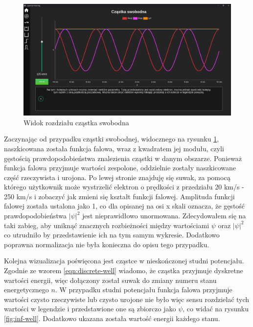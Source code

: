 \documentclass{SGGW-thesis}
\begin{document}
	\begin{figure}[H]
	\includegraphics[width=\textwidth,height=\textheight,keepaspectratio]{free.png} 
	\caption{Widok rozdziału cząstka swobodna}
	\label{fig:free-chart}
	\end{figure}	
	
	Zaczynając od przypadku cząstki swobodnej, widocznego na rysunku \ref{fig:free-chart}, naszkicowana została funkcja falowa, wraz z kwadratem jej modułu, czyli gęstością prawdopodobieństwa znalezienia cząstki w danym obszarze. Ponieważ funkcja falowa przyjmuje wartości zespolone, oddzielnie zostały naszkicowane część rzeczywista i urojona. Po lewej stronie znajduję się suwak, za pomocą którego użytkownik może wystrzelić elektron o prędkości z przedziału 20 km/s - 250 km/s i zobaczyć jak zmieni się kształt funkcji falowej. Amplituda funkcji falowej została ustalona jako 1, co dla opisanej na osi x skali oznacza, że gęstość prawdopodobieństwa $|\psi|^2$ jest nieprawidłowo unormowana. Zdecydowałem się na taki zabieg, aby uniknąć znacznych rozbieżności między wartościami $\psi$ oraz $|\psi|^2$ co utrudniło by przedstawienie ich na tym samym wykresie. Dodatkowo poprawna normalizacja nie była konieczna do opisu tego przypadku. 
	
	Kolejna wizualizacja poświęcona jest cząstce w nieskończonej studni potencjału. Zgodnie ze wzorem \ref{eqn:discrete-well} wiadomo, że cząstka przyjmuje dyskretne wartości energii, więc dołączony został suwak do zmiany numeru stanu energetycznego $n$. W przypadku studni potencjału funkcja falowa przyjmuje wartości czysto rzeczywiste lub czysto urojone nie było więc sensu rozdzielać tych wartości w legendzie i przedstawione one są zbiorczo jako $\psi$, co widać na rysunku \ref{fig:inf-well}. Dodatkowo ukazana została wartość energii każdego stanu.
	
\end{document}
